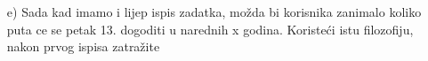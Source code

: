 \documentclass{exam}
\begin{document}
\begin{itemize}
                                                                                \item[e)]
                                                                                Sada
                                                                                kad
                                                                                imamo
                                                                                i
                                                                                lijep
                                                                                ispis
                                                                                zadatka,
                                                                                možda
                                                                                bi
                                                                                korisnika
                                                                                zanimalo
                                                                                koliko
                                                                                puta
                                                                                ce
                                                                                se
                                                                                petak
                                                                                13.
                                                                                dogoditi
                                                                                u
                                                                                narednih
                                                                                x
                                                                                godina.
                                                                                Koristeći
                                                                                istu
                                                                                filozofiju,
                                                                                nakon
                                                                                prvog
                                                                                ispisa
                                                                                zatražite

\end{itemize}
\end{document}
